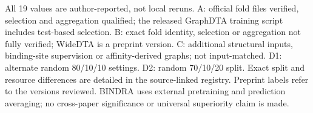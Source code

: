 \begin{table}[htbp]
\begin{singlespace}
\begin{tabular}
\bottomrule\end{tabular}\par\vspace{6pt}
{\raggedright\footnotesize All 19 values are author-reported, not local reruns. A: official fold files verified, selection and aggregation qualified; the released GraphDTA training script includes test-based selection. B: exact fold identity, selection or aggregation not fully verified; WideDTA is a preprint version. C: additional structural inputs, binding-site supervision or affinity-derived graphs; not input-matched. D1: alternate random 80/10/10 settings. D2: random 70/10/20 split. Exact split and resource differences are detailed in the source-linked registry. Preprint labels refer to the versions reviewed. BINDRA uses external pretraining and prediction averaging; no cross-paper significance or universal superiority claim is made.\par}
\end{singlespace}\end{table}
